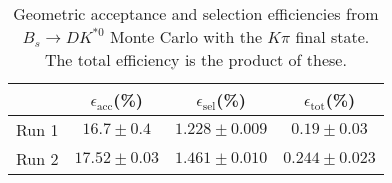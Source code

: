 \begin{table}
    \centering
    \begin{tabular}{cccc}
        \toprule
        & $\epsilon_\mathrm{acc}$(\%) &  $\epsilon_\mathrm{sel}$(\%) &  $\epsilon_\mathrm{tot}$(\%) \\
        \midrule
        Run 1 & $16.7 \pm 0.4$ & $1.228 \pm 0.009$ & $0.19 \pm 0.03$ \\
        Run 2 & $17.52 \pm 0.03$ & $1.461 \pm 0.010$ & $0.244 \pm 0.023$ \\
        \bottomrule
    \end{tabular}
    \caption{Geometric acceptance and selection efficiencies from  $B_s \to DK^{*0}$ Monte Carlo with the $K\pi$ final state.  The total efficiency is the product of these.}
\label{tab:selection_efficiency_Bs}
\end{table}
